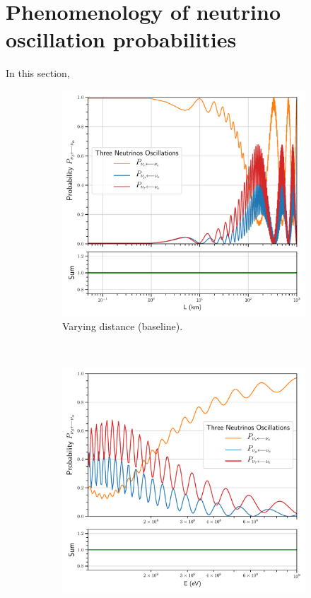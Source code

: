 \documentclass[twocolumn,secnumarabic,amssymb, nobibnotes, aps, prd,10pt]{revtex4-1}
\begin{document}
\section{Phenomenology of neutrino oscillation probabilities}
\label{sec:pheno}

In this section, 

\begin{figure}
\captionsetup[subfigure]{aboveskip=-1.5pt,belowskip=-1.5pt} 
\begin{subfigure}{1.05\linewidth}
\includegraphics[width=\linewidth]{Osc3VacuumBaseline.pdf}
\caption{Varying distance (baseline).} 
\label{higgs:sspt} 
\end{subfigure} 
\\
\begin{subfigure}{1.05\linewidth}
\includegraphics[width=\linewidth]{Osc3VacuumEnergy.pdf}

\end{subfigure}
\end{figure}
\end{document}
